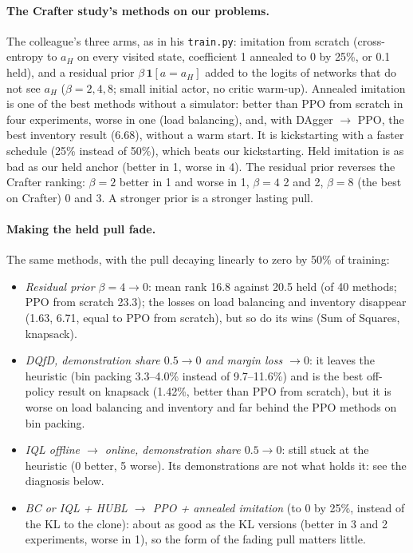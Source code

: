 \documentclass[11pt,a4paper]{article}
\begin{document}
\paragraph{The Crafter study's methods on our problems.} The colleague's three arms, as in his \texttt{train.py}:
imitation from scratch (cross-entropy to $a_H$ on every visited state, coefficient 1 annealed to 0 by 25\%, or 0.1
held), and a residual prior $\beta\,\mathbf 1[a = a_H]$ added to the logits of networks that do not see $a_H$
($\beta = 2, 4, 8$; small initial actor, no critic warm-up). Annealed imitation is one of the best methods without a
simulator: better than PPO from scratch in four experiments, worse in one (load balancing), and, with DAgger $\to$ PPO, the best inventory result
(6.68), without a warm start. It is kickstarting with a faster schedule (25\%
instead of 50\%), which beats our kickstarting. Held imitation is as bad as our held anchor (better in 1, worse in
4). The residual prior reverses the Crafter ranking: $\beta = 2$ better in 1 and worse in 1, $\beta = 4$ 2 and 2,
$\beta = 8$ (the best on Crafter) 0 and 3. A stronger prior is a stronger lasting pull.

\paragraph{Making the held pull fade.} The same methods, with the pull decaying linearly to zero by 50\% of training:
\begin{itemize}[leftmargin=*]
\item \emph{Residual prior $\beta = 4 \to 0$}: mean rank 16.8 against 20.5 held (of 40 methods; PPO from scratch 23.3); the losses on load balancing and
  inventory disappear (1.63, 6.71, equal to PPO from scratch), but so do its wins (Sum of Squares, knapsack).
\item \emph{DQfD, demonstration share $0.5 \to 0$ and margin loss $\to 0$}: it leaves the heuristic (bin packing
  3.3--4.0\% instead of 9.7--11.6\%) and is the best off-policy result on knapsack (1.42\%, better than PPO from
  scratch), but it is worse on load balancing and inventory and far behind the PPO methods on bin packing.
\item \emph{IQL offline $\to$ online, demonstration share $0.5 \to 0$}: still stuck at the heuristic (0 better, 5
  worse). Its demonstrations are not what holds it: see the diagnosis below.
\item \emph{BC or IQL + HUBL $\to$ PPO + annealed imitation} (to 0 by 25\%, instead of the KL to the clone): about
  as good as the KL versions (better in 3 and 2 experiments, worse in 1), so the form of the fading pull matters
  little.
\end{itemize}
\end{document}
